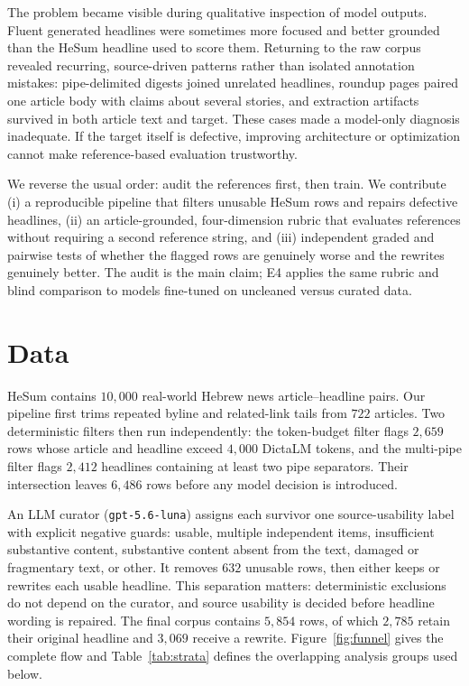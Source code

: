 \documentclass[11pt]{article}
\begin{document}
The problem became visible during qualitative inspection of model outputs. Fluent generated headlines
were sometimes more focused and better grounded than the HeSum headline used to score them. Returning
to the raw corpus revealed recurring, source-driven patterns rather than isolated annotation mistakes:
pipe-delimited digests joined unrelated headlines, roundup pages paired one article body with claims
about several stories, and extraction artifacts survived in both article text and target. These cases
made a model-only diagnosis inadequate. If the target itself is defective, improving architecture or
optimization cannot make reference-based evaluation trustworthy.

We reverse the usual order: audit the references first, then train. We contribute (i) a reproducible
pipeline that filters unusable HeSum rows and repairs defective headlines, (ii) an article-grounded,
four-dimension rubric that evaluates references without requiring a second reference string, and
(iii) independent graded and pairwise tests of whether the flagged rows are genuinely worse and the
rewrites genuinely better. The audit is the main claim; E4 applies the same rubric and blind
comparison to models fine-tuned on uncleaned versus curated data.

\section{Data}
\label{sec:data}

HeSum \citep{paz-argaman2024hesum} contains $10{,}000$ real-world Hebrew news article--headline pairs.
Our pipeline first trims
repeated byline and related-link tails from $722$ articles. Two deterministic filters then run
independently: the token-budget filter flags $2{,}659$ rows whose article and headline exceed
$4{,}000$ DictaLM tokens, and the multi-pipe filter flags $2{,}412$ headlines containing at least two
pipe separators. Their intersection leaves $6{,}486$ rows before any model decision is introduced.

An LLM curator (\texttt{gpt-5.6-luna}) assigns each survivor one source-usability label with explicit
negative guards: usable, multiple independent items, insufficient substantive content, substantive
content absent from the text, damaged or fragmentary text, or other. It removes $632$ unusable rows,
then either keeps or rewrites each usable headline. This separation matters: deterministic exclusions
do not depend on the curator, and source usability is decided before headline wording is repaired. The
final corpus contains $5{,}854$ rows, of which $2{,}785$ retain their original headline and $3{,}069$
receive a rewrite. Figure~\ref{fig:funnel} gives the complete flow and Table~\ref{tab:strata} defines the
overlapping analysis groups used below.
\end{document}
